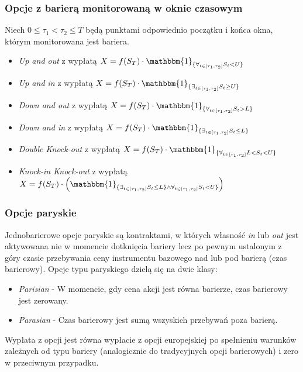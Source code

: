 \documentclass{beamer}
\begin{document}
\begin{frame}
\frametitle{Opcje z barierą monitorowaną w oknie czasowym}
  Niech $0 \leq \tau_1 < \tau_2 \leq T$ będą punktami odpowiednio początku i końca okna, którym monitorowana jest bariera. 
\begin{itemize}
\item \emph{Up and out} z wypłatą $X = f(S_T) \cdot \mathbbm{1}_{\{\forall_{ t \in \left[ \tau_1, \tau_2 \right] } S_t < U \}}$
\item \emph{Up and in} z wypłatą $X = f(S_T) \cdot \mathbbm{1}_{\{\exists_{ t \in \left[ \tau_1, \tau_2 \right] } S_t \geq U \}}$
\item \emph{Down and out} z wypłatą $X = f(S_T) \cdot \mathbbm{1}_{\{\forall_{ t \in \left[ \tau_1, \tau_2 \right] } S_t > L \}}$
\item \emph{Down and in} z wypłatą $X = f(S_T) \cdot \mathbbm{1}_{\{\exists_{ t \in \left[ \tau_1, \tau_2 \right] } S_t \leq L \}}$
\item \emph{Double Knock-out} z wypłatą $X = f(S_T) \cdot \mathbbm{1}_{\{\forall_{ t \in \left[ \tau_1, \tau_2 \right] } L < S_t  < U \}}$
\item \emph{Knock-in Knock-out} z wypłatą $X = f(S_T) \cdot \left( \mathbbm{1}_{\{\exists_{ t \in \left[ \tau_1, \tau_2 \right] } S_t \leq L \} \wedge \forall_{ t \in \left[ \tau_1, \tau_2 \right] } S_t < U \}}\right)$

\end{itemize}
\end{frame}

\begin{frame}
\frametitle{Opcje paryskie}
Jednobarierowe opcje paryskie są kontraktami, w których własność \emph{in} lub \emph{out} jest aktywowana nie w momencie dotknięcia bariery lecz po pewnym ustalonym z góry czasie przebywania ceny instrumentu bazowego nad lub pod barierą (czas barierowy). Opcje typu paryskiego dzielą się na dwie klasy:
\begin{itemize}
\item  \emph{Parisian} - W momencie, gdy cena akcji jest równa barierze, czas barierowy jest zerowany.
\item  \emph{Parasian} - Czas barierowy jest sumą wszyskich przebywań poza barierą.
\end{itemize}
Wypłata z opcji jest równa wypłacie z opcji europejskiej po spełnieniu warunków zależnych od typu bariery (analogicznie do tradycyjnych opcji barierowych) i zero w przeciwnym przypadku.
  
\end{frame}
\end{document}
